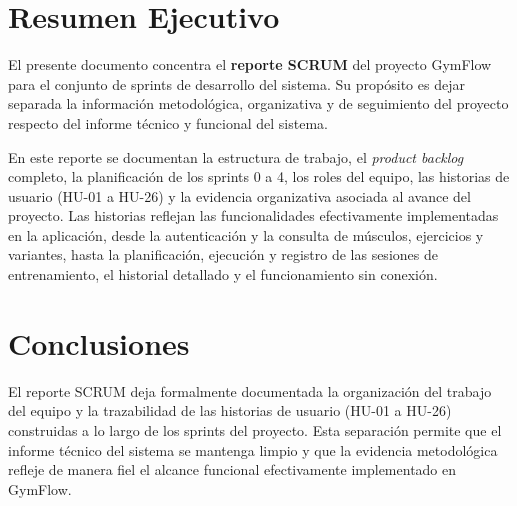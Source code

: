 \documentclass[12pt,letterpaper]{article}
\begin{document}

\clearpage
\tableofcontents
\clearpage

\section{Resumen Ejecutivo}

El presente documento concentra el \textbf{reporte SCRUM} del proyecto GymFlow para el conjunto de sprints de desarrollo del sistema. Su propósito es dejar separada la información metodológica, organizativa y de seguimiento del proyecto respecto del informe técnico y funcional del sistema.

En este reporte se documentan la estructura de trabajo, el \textit{product backlog} completo, la planificación de los sprints 0 a 4, los roles del equipo, las historias de usuario (HU-01 a HU-26) y la evidencia organizativa asociada al avance del proyecto. Las historias reflejan las funcionalidades efectivamente implementadas en la aplicación, desde la autenticación y la consulta de músculos, ejercicios y variantes, hasta la planificación, ejecución y registro de las sesiones de entrenamiento, el historial detallado y el funcionamiento sin conexión.



\section{Conclusiones}

El reporte SCRUM deja formalmente documentada la organización del trabajo del equipo y la trazabilidad de las historias de usuario (HU-01 a HU-26) construidas a lo largo de los sprints del proyecto. Esta separación permite que el informe técnico del sistema se mantenga limpio y que la evidencia metodológica refleje de manera fiel el alcance funcional efectivamente implementado en GymFlow.
\end{document}
